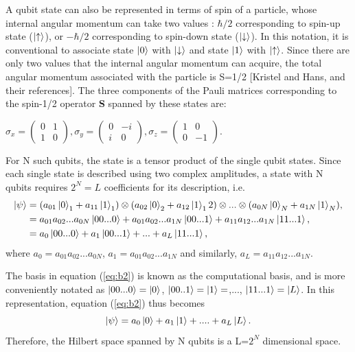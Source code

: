 \documentclass[../main.tex]{subfiles}
\begin{document}
A qubit state can also be represented in terms of spin of a particle, whose internal angular momentum can take two values : $\hbar/2$ corresponding to spin-up state ($\ket{\uparrow}$), or $-\hbar/2$ corresponding to spin-down state ($\ket{\downarrow}$). In this notation, it is conventional to associate state $\ket{0}$ with $\ket{\downarrow}$ and state $\ket{1}$ with $\ket{\uparrow}$. Since there are only two values that the internal angular momentum can acquire, the total angular momentum associated with the particle is S=1/2 [Kristel and Hans, and their references]. The three components of the Pauli matrices corresponding to the spin-1/2 operator \textbf{S} spanned by these states are:
\begin{center}
$ \sigma_x= \begin{pmatrix}
0 & 1\\
1 & 0
\end{pmatrix}, \sigma_y= \begin{pmatrix}
0 & -i\\
i & 0
\end{pmatrix}, \sigma_z= \begin{pmatrix}
1 & 0\\
0 & -1
\end{pmatrix}.
$\\
\end{center}
For N such qubits, the state is a tensor product of the single qubit states. Since each single state is described using two complex amplitudes, a state with N qubits requires $2^N=L$ coefficients for its description, i.e. 
\begin{equation}
\begin{split}
\ket{\psi} &= (a_{01}\ket{0}_1+a_{11}\ket{1}_1)\otimes(a_{02}\ket{0}_2+a_{12}\ket{1}_12)\otimes...\otimes(a_{0N}\ket{0}_N+a_{1N}\ket{1}_N),\\ 
		  &=a_{01}a_{02}...a_{0N}\ket{00...0}+a_{01}a_{02}...a_{1N}\ket{00...1}+a_{11}a_{12}...a_{1N}\ket{11...1},\\
		  &=a_0 \ket{00...0}+a_1 \ket{00...1}+...+a_L \ket{11...1},\\ \label{eq:b2}
\end{split}
\end{equation}
where $a_0=a_{01}a_{02}...a_{0N}$, $a_1=a_{01}a_{02}...a_{1N}$ and similarly, $a_L=a_{11}a_{12}...a_{1N}$.

The basis in equation (\ref{eq:b2}) is known as the computational basis, and is more conveniently notated as $\ket{00...0}=\ket{0}$, $\ket{00..1}=\ket{1}=$,..., $\ket{11...1}=\ket{L}$. In this representation, equation (\ref{eq:b2}) thus becomes
\begin{equation}
\ket{\psi}= a_0\ket{0}+a_1\ket{1}+....+a_L\ket{L}.  \label{eq:b3}
\end{equation}
Therefore, the Hilbert space spanned by N qubits is a L=$2^N$ dimensional space.
\end{document}
